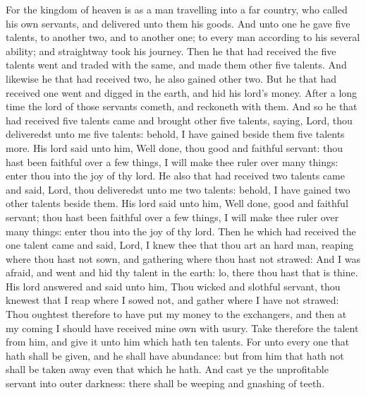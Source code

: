  For the kingdom of heaven is as a man travelling into a
far country, who called his own servants, and delivered unto them his
goods.  And unto one he gave five talents, to another two,
and to another one; to every man according to his several ability; and
straightway took his journey.  Then he that had received
the five talents went and traded with the same, and made them other five
talents.  And likewise he that had received two, he also
gained other two.  But he that had received one went and
digged in the earth, and hid his lord's money.  After a
long time the lord of those servants cometh, and reckoneth with them.
 And so he that had received five talents came and brought
other five talents, saying, Lord, thou deliveredst unto me five talents:
behold, I have gained beside them five talents more.  His
lord said unto him, Well done, thou good and faithful servant: thou hast
been faithful over a few things, I will make thee ruler over many
things: enter thou into the joy of thy lord.  He also that
had received two talents came and said, Lord, thou deliveredst unto me
two talents: behold, I have gained two other talents beside them.
 His lord said unto him, Well done, good and faithful
servant; thou hast been faithful over a few things, I will make thee
ruler over many things: enter thou into the joy of thy lord.
 Then he which had received the one talent came and said,
Lord, I knew thee that thou art an hard man, reaping where thou hast not
sown, and gathering where thou hast not strawed:  And I was
afraid, and went and hid thy talent in the earth: lo, there thou hast
that is thine.  His lord answered and said unto him, Thou
wicked and slothful servant, thou knewest that I reap where I sowed not,
and gather where I have not strawed:  Thou oughtest
therefore to have put my money to the exchangers, and then at my coming
I should have received mine own with usury.  Take therefore
the talent from him, and give it unto him which hath ten talents.
 For unto every one that hath shall be given, and he shall
have abundance: but from him that hath not shall be taken away even that
which he hath.  And cast ye the unprofitable servant into
outer darkness: there shall be weeping and gnashing of teeth.

